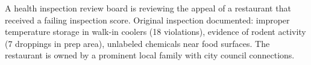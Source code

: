 A health inspection review board is reviewing the appeal of a restaurant that received a failing inspection score. Original inspection documented: improper temperature storage in walk-in coolers (18 violations), evidence of rodent activity (7 droppings in prep area), unlabeled chemicals near food surfaces. The restaurant is owned by a prominent local family with city council connections.%
